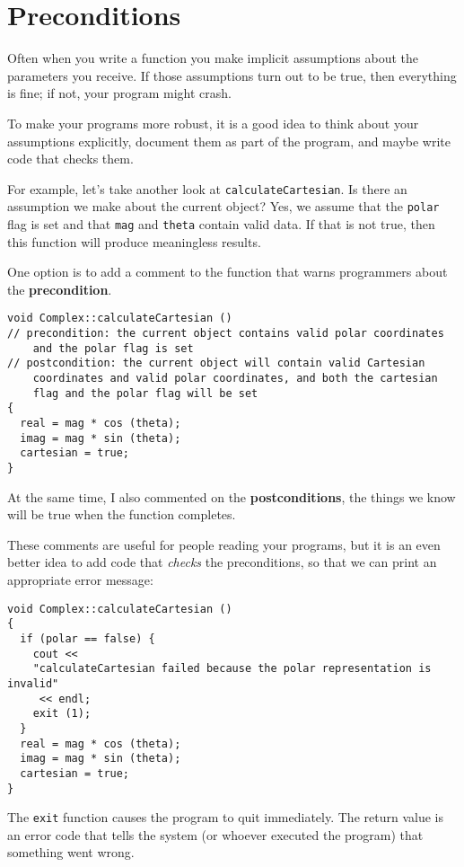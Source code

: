 \section{Preconditions}

Often when you write a function you make implicit assumptions
about the parameters you receive.  If those assumptions turn
out to be true, then everything is fine; if not, your program
might crash.

To make your programs more robust, it is a good idea to think
about your assumptions explicitly, document them as part of the
program, and maybe write code that checks them.

For example, let's take another look at {\tt calculateCartesian}.
Is there an assumption we make about the current object?  Yes,
we assume that the {\tt polar} flag is set and that {\tt mag}
and {\tt theta} contain valid data.  If that is not true, then
this function will produce meaningless results.

One option is to add a comment to the function that warns
programmers about the {\bf precondition}.

\begin{verbatim}
void Complex::calculateCartesian ()
// precondition: the current object contains valid polar coordinates
	and the polar flag is set
// postcondition: the current object will contain valid Cartesian
	coordinates and valid polar coordinates, and both the cartesian
	flag and the polar flag will be set
{
  real = mag * cos (theta);
  imag = mag * sin (theta);
  cartesian = true;
}
\end{verbatim}
%
At the same time, I also commented on the {\bf postconditions},
the things we know will be true when the function completes.

These comments are useful for people reading your programs, but
it is an even better idea to add code that {\em checks} the
preconditions, so that we can print an appropriate error message:

\begin{verbatim}
void Complex::calculateCartesian ()
{
  if (polar == false) {
    cout <<
    "calculateCartesian failed because the polar representation is invalid"
	 << endl;
    exit (1);
  }
  real = mag * cos (theta);
  imag = mag * sin (theta);
  cartesian = true;
}
\end{verbatim}
%
The {\tt exit} function causes the program to quit immediately.  The
return value is an error code that tells the system (or whoever
executed the program) that something went wrong.

